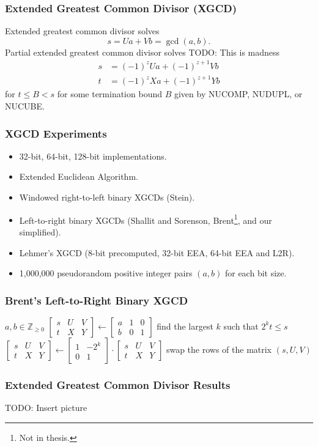 \documentclass{beamer}
\newcommand{\ZZgez}{\mathbb{Z}_{\ge 0}}
\newcommand{\matrixtt}[4]{\left[ \begin{array}{rr} #1 & #2 \\ #3 & #4 \end{array} \right]}
\newcommand{\matrixThreeTwo}[6]{\left[ \begin{array}{rrr} #1 & #2 & #3 \\ #4 & #5 & #6 \end{array} \right]}
\begin{document}
\begin{frame}
\frametitle{Extended Greatest Common Divisor (XGCD)}
Extended greatest common divisor solves
\[
	s = Ua + Vb = \gcd(a, b).
\]
Partial extended greatest common divisor solves
TODO: This is madness
\begin{eqnarray*}
	s &= (-1)^z Ua + (-1)^{z+1} Vb \\
	t &= (-1)^z Xa + (-1)^{z+1} Yb
\end{eqnarray*}
for $t \le B < s$ for some termination bound $B$ given by NUCOMP, NUDUPL, or NUCUBE.

\end{frame}

\begin{frame}
\frametitle{XGCD Experiments}
\begin{itemize}
\item 32-bit, 64-bit, 128-bit implementations.
\item Extended Euclidean Algorithm.
\item Windowed right-to-left binary XGCDs (Stein).
\item Left-to-right binary XGCDs (Shallit and Sorenson, Brent\footnote{Not in thesis.}, and our simplified).
\item Lehmer's XGCD (8-bit precomputed, 32-bit EEA, 64-bit EEA and L2R).
\item 1,000,000 pseudorandom positive integer pairs $(a,b)$ for each bit size.
\end{itemize}
\end{frame}

\begin{frame}
\frametitle{Brent's Left-to-Right Binary XGCD}
\begin{algorithmic}[1]
\Require $a, b \in \ZZgez$
\State $\matrixThreeTwo{s}{U}{V}{t}{X}{Y} \gets \matrixThreeTwo{a}{1}{0}{b}{0}{1}$
	\State find the largest $k$ such that $2^k t \le s$
	\State $\matrixThreeTwo{s}{U}{V}{t}{X}{Y} \gets \matrixtt{1}{-2^k}{0}{1} \cdot
		    \matrixThreeTwo{s}{U}{V}{t}{X}{Y}$
	 swap the rows of the matrix \EndIf
\EndWhile
\State \Return $(s, U, V)$
\end{algorithmic}
\end{frame}

\begin{frame}
\frametitle{Extended Greatest Common Divisor Results}
TODO: Insert picture
\end{frame}
\end{document}
